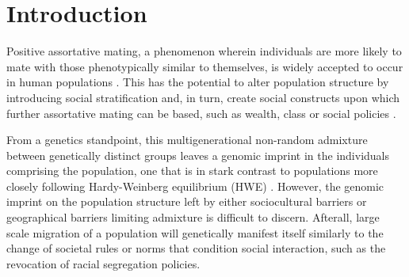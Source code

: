 \documentclass[11pt]{article}
\begin{document}


\newpage
\tableofcontents
\thispagestyle{empty}
\newpage
\linenumbers






\setcounter{page}{3}
\section{Introduction}





Positive assortative mating, a phenomenon wherein individuals are more likely to mate with those phenotypically similar to themselves, is widely accepted to occur in human populations \parencite{Norris2019}. This has the potential to alter population structure by introducing social stratification and, in turn, create social constructs upon which further assortative mating can be based, such as wealth, class or social policies \parencite{Risch2009}.

From a genetics standpoint, this multigenerational non-random admixture between genetically distinct groups leaves a genomic imprint in the individuals comprising the population, one that is in stark contrast to populations more closely following Hardy-Weinberg equilibrium (HWE) \parencite{Zaitlen2017}. However, the genomic imprint on the population structure left by either sociocultural barriers or geographical barriers limiting admixture is difficult to discern. Afterall, large scale migration of a population will genetically manifest itself similarly to the change of societal rules or norms that condition social interaction, such as the revocation of racial segregation policies. 
\end{document}
